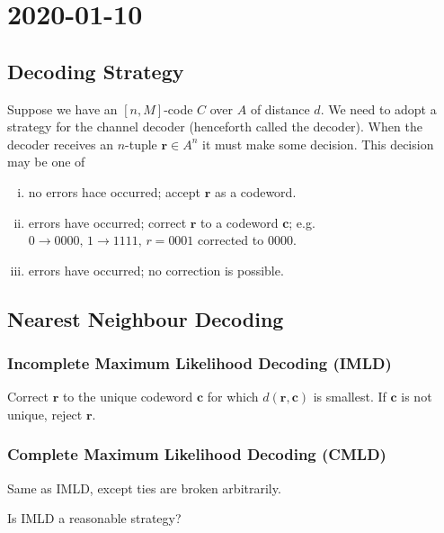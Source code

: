 \section{2020-01-10}
\subsection{Decoding Strategy}
Suppose we have an $ [n,M] $-code $ C $ over $ A $ of distance $ d $.
We need to adopt a strategy for the channel decoder (henceforth called the decoder).
When the decoder receives an $ n $-tuple $ \bm{r}\in A^n $ it must make some decision.
This decision may be one of
\begin{enumerate}[(i)]
    \item no errors hace occurred; accept $ \bm{r} $ as a codeword.
    \item errors have occurred; correct $ \bm{r} $ to a codeword $ \bm{c} $;
    e.g. $ 0 \rightarrow 0000,\,1 \rightarrow 1111,\,r=0001 $ corrected to
    $ 0000 $.
    \item errors have occurred; no correction is possible.
\end{enumerate}

\subsection{Nearest Neighbour Decoding}
\subsubsection{Incomplete Maximum Likelihood Decoding (IMLD)}
Correct $ \bm{r} $ to the unique codeword $ \bm{c} $ for which
$ d(\bm{r},\bm{c}) $ is smallest.
If $ \bm{c} $ is not unique, reject $ \bm{r} $.
\subsubsection{Complete Maximum Likelihood Decoding (CMLD)}
Same as IMLD, except ties are broken arbitrarily.

 Is IMLD a reasonable strategy?

